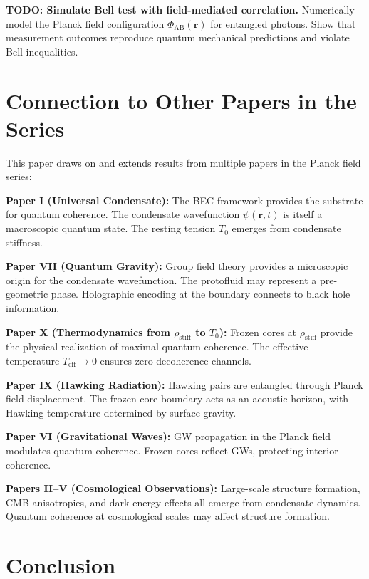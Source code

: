 \documentclass[11pt,a4paper]{article}
\newcommand{\rhostiff}{\ensuremath{\rho_{\mathrm{stiff}}}}
\newcommand{\Tzero}{\ensuremath{T_0}}
\theoremstyle{definition}
\theoremstyle{remark}
\begin{document}
\textbf{TODO: Simulate Bell test with field-mediated correlation.} Numerically model the Planck field configuration $\Phi_{\mathrm{AB}}(\mathbf{r})$ for entangled photons. Show that measurement outcomes reproduce quantum mechanical predictions and violate Bell inequalities.

\section{Connection to Other Papers in the Series}
\label{sec:connections}

This paper draws on and extends results from multiple papers in the Planck field series:

\textbf{Paper I (Universal Condensate):} The BEC framework provides the substrate for quantum coherence. The condensate wavefunction $\psi(\mathbf{r},t)$ is itself a macroscopic quantum state. The resting tension $\Tzero$ emerges from condensate stiffness.

\textbf{Paper VII (Quantum Gravity):} Group field theory provides a microscopic origin for the condensate wavefunction. The protofluid may represent a pre-geometric phase. Holographic encoding at the boundary connects to black hole information.

\textbf{Paper X (Thermodynamics from $\rhostiff$ to $\Tzero$):} Frozen cores at $\rhostiff$ provide the physical realization of maximal quantum coherence. The effective temperature $T_{\mathrm{eff}} \to 0$ ensures zero decoherence channels.

\textbf{Paper IX (Hawking Radiation):} Hawking pairs are entangled through Planck field displacement. The frozen core boundary acts as an acoustic horizon, with Hawking temperature determined by surface gravity.

\textbf{Paper VI (Gravitational Waves):} GW propagation in the Planck field modulates quantum coherence. Frozen cores reflect GWs, protecting interior coherence.

\textbf{Papers II--V (Cosmological Observations):} Large-scale structure formation, CMB anisotropies, and dark energy effects all emerge from condensate dynamics. Quantum coherence at cosmological scales may affect structure formation.

\section{Conclusion}
\label{sec:conclusions}
\end{document}
